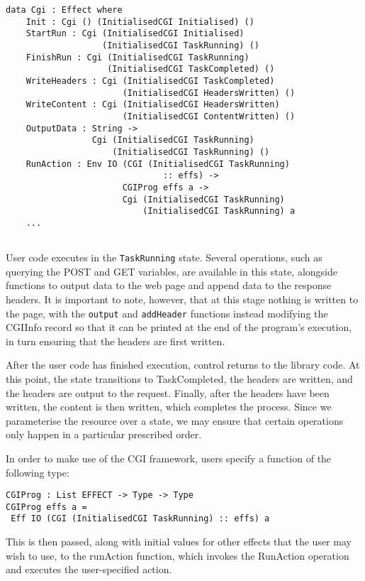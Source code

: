 \documentclass[preprint]{sigplanconf}
\begin{document}
{\small
\begin{verbatim}
data Cgi : Effect where
    Init : Cgi () (InitialisedCGI Initialised) ()
    StartRun : Cgi (InitialisedCGI Initialised) 
                   (InitialisedCGI TaskRunning) ()
    FinishRun : Cgi (InitialisedCGI TaskRunning) 
                    (InitialisedCGI TaskCompleted) ()
    WriteHeaders : Cgi (InitialisedCGI TaskCompleted) 
                       (InitialisedCGI HeadersWritten) ()
    WriteContent : Cgi (InitialisedCGI HeadersWritten) 
                       (InitialisedCGI ContentWritten) ()
    OutputData : String -> 
                 Cgi (InitialisedCGI TaskRunning) 
                     (InitialisedCGI TaskRunning) ()
    RunAction : Env IO (CGI (InitialisedCGI TaskRunning) 
                               :: effs) -> 
                       CGIProg effs a -> 
                       Cgi (InitialisedCGI TaskRunning) 
                           (InitialisedCGI TaskRunning) a
    ...
    
\end{verbatim}
}
User code executes in the \texttt{TaskRunning} state. Several operations, such as querying the POST and GET variables, are available in this state, alongside functions to output data to the web page and append data to the response headers. It is important to note, however, that at this stage nothing is written to the page, with the \texttt{output} and \texttt{addHeader} functions instead modifying the CGIInfo record so that it can be printed at the end of the program's execution, in turn ensuring that the headers are first written.

After the user code has finished execution, control returns to the library code. At this point, the state transitions to TaskCompleted, the headers are written, and the headers are output to the request. Finally, after the headers have been written, the content is then written, which completes the process. Since we parameterise the resource over a state, we may ensure that certain operations only happen in a particular prescribed order.

In order to make use of the CGI framework, users specify a function of the following type:
{\small
\begin{verbatim}
CGIProg : List EFFECT -> Type -> Type
CGIProg effs a = 
 Eff IO (CGI (InitialisedCGI TaskRunning) :: effs) a
\end{verbatim}
}
This is then passed, along with initial values for other effects that the user may wish to use, to the runAction function, which invokes the RunAction operation and executes the user-specified action.
\end{document}
